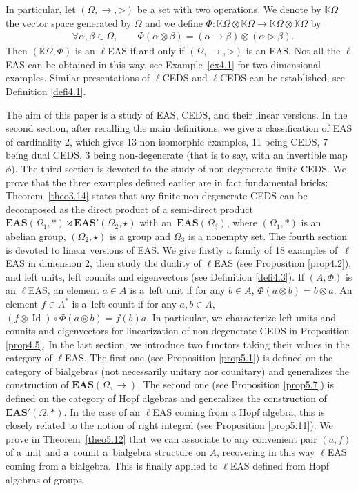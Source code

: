 \documentclass[10pt,a4paper]{amsart}
\numberwithin{equation}{section}
\newcommand{\eas}{\mathbf{EAS}}
\begin{document}
In particular, let $(\Omega,\rightarrow,\triangleright)$ be a set with two operations. We denote by $\mathbb{K}\Omega$ the vector space generated by $\Omega$ and we define $\Phi\colon\mathbb{K}\Omega\otimes \mathbb{K}\Omega\longrightarrow\mathbb{K}\Omega\otimes \mathbb{K}\Omega$ by
\begin{align*}
&\forall \alpha,\beta\in \Omega,\qquad\Phi(\alpha\otimes \beta)=(\alpha \rightarrow \beta)\otimes (\alpha \triangleright \beta).
\end{align*}
Then $(\mathbb{K}\Omega,\Phi)$ is an $\ell$EAS if and only if $(\Omega,\rightarrow,\triangleright)$ is an EAS.
Not all the $\ell$EAS can be obtained in this way, see Example~\ref{ex4.1} for two-dimensional examples. Similar presentations of $\ell$CEDS and $\ell$CEDS can be established, see Definition \ref{defi4.1}.

The aim of this paper is a study of EAS, CEDS, and their linear versions. In the second section, after recalling the main definitions, we give a classification of EAS of cardinality 2,
which gives 13 non-isomorphic examples, 11 being CEDS, 7 being dual CEDS, 3 being non-degenerate (that is to say, with an invertible map $\phi$).
The third section is devoted to the study of non-degenerate finite CEDS. We prove that the three examples defined earlier are in fact fundamental bricks:
Theorem~\ref{theo3.14} states that any finite non-degenerate CEDS can be decomposed as the direct product of a semi-direct product $\eas(\Omega_1,*) \rtimes \eas'(\Omega_2,\star)$ with an~$\eas(\Omega_3)$,
where $(\Omega_1,*)$ is an abelian group, $(\Omega_2,\star)$ is a group and $\Omega_3$ is a nonempty set. The fourth section is devoted to linear versions of EAS.
We give firstly a family of 18 examples of~$\ell$EAS in dimension 2, then study the duality of $\ell$EAS (see Proposition \ref{prop4.2}), and left units, left counits and eigenvectors (see Definition \ref{defi4.3}).
If $(A,\Phi)$ is an $\ell$EAS, an element $a\in A$ is a~left unit if for any $b\in A$, $\Phi(a\otimes b)=b\otimes a$. An element $f \in A^*$ is a~left counit if for any $a,b\in A$, $(f\otimes \operatorname{Id})\circ \Phi(a\otimes b)=f(b)a$.
In particular, we characterize left units and counits and eigenvectors for linearization of non-degenerate CEDS in Proposition \ref{prop4.5}.
In the last section, we introduce two functors taking their values in the category of $\ell$EAS.
The first one (see Proposition \ref{prop5.1}) is defined on the category of bialgebras (not necessarily unitary nor counitary) and generalizes the construction of $\eas(\Omega,\rightarrow)$.
The second one (see Proposition \ref{prop5.7}) is defined on the category of Hopf algebras and generalizes the construction of $\eas'(\Omega,*)$.
In the case of an $\ell$EAS coming from a Hopf algebra, this is closely related to the notion of right integral (see Proposition \ref{prop5.11}).
We prove in Theorem~\ref{theo5.12} that we can associate to any convenient pair $(a,f)$ of a unit and a~counit a~bialgebra structure on $A$, recovering in this way $\ell$EAS coming from a bialgebra.
This is finally applied to $\ell$EAS defined from Hopf algebras of groups.
\end{document}
